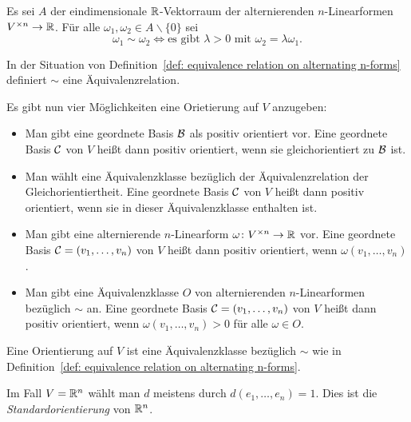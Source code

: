 \begin{definition}\label{def: equivalence relation on alternating n-forms}
  Es sei $A$ der eindimensionale $\mathbb{R}$-Vektorraum der alternierenden $n$-Linear\-for\-men $V^{\times n} \to \mathbb{R}$. Für alle $\omega_1, \omega_2 \in A \smallsetminus \{0\}$ sei
  \[
    \omega_1 \sim \omega_2
    \iff
    \text{es gibt $\lambda > 0$ mit $\omega_2 = \lambda \omega_1$}.
  \]
\end{definition}


\begin{lemma}
  In der Situation von Definition~\ref{def: equivalence relation on alternating n-forms} definiert $\sim$ eine Äquivalenzrelation.
\end{lemma}


\begin{remark}
  Es gibt nun vier Möglichkeiten eine Orietierung auf $V$ anzugeben:
  \begin{itemize}
    \item
      Man gibt eine geordnete Basis $\mathcal{B}$ als positiv orientiert vor.
      Eine geordnete Basis $\mathcal{C}$ von $V$ heißt dann positiv orientiert, wenn sie gleichorientiert zu $\mathcal{B}$ ist.
    \item
      Man wählt eine Äquivalenzklasse bezüglich der Äquivalenzrelation der Gleichorientiertheit.
      Eine geordnete Basis $\mathcal{C}$ von $V$ heißt dann positiv orientiert, wenn sie in dieser Äquivalenzklasse enthalten ist.
    \item
      Man gibt eine alternierende $n$-Linearform $\omega \colon V^{\times n} \to \mathbb{R}$ vor.
      Eine geordnete Basis $\mathcal{C} = (v_1, \dotsc, v_n)$ von $V$ heißt dann positiv orientiert, wenn $\omega(v_1, \dotsc, v_n)$.
    \item
      Man gibt eine Äquivalenzklasse $O$ von alternierenden $n$-Linearformen bezüglich $\sim$ an.
      Eine geordnete Basis $\mathcal{C} = (v_1, \dotsc, v_n)$ von $V$ heißt dann positiv orientiert, wenn $\omega(v_1, \dotsc, v_n) > 0$ für alle $\omega \in O$.
  \end{itemize}
\end{remark}


\begin{definition}
  Eine Orientierung auf $V$ ist eine Äquivalenzklasse bezüglich $\sim$ wie in Definition~\ref{def: equivalence relation on alternating n-forms}.
\end{definition}


\begin{remark}
  Im Fall $V = \mathbb{R}^n$ wählt man $d$ meistens durch $d(e_1, \dotsc, e_n) = 1$.
  Dies ist die \emph{Standardorientierung} von $\mathbb{R}^n$.
\end{remark}











